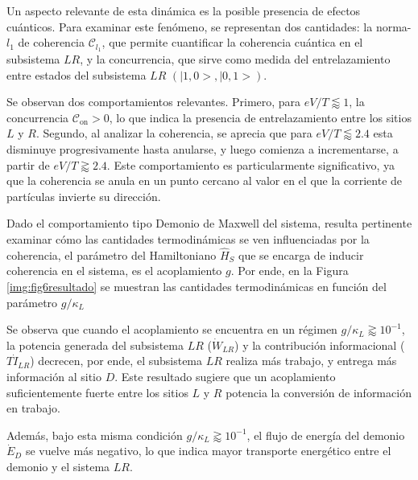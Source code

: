 Un aspecto relevante de esta dinámica es la posible presencia de efectos cuánticos. Para examinar este fenómeno, se representan dos cantidades: la norma-$l_{1}$ de coherencia \( \mathcal{C}_{l_{1}} \), que permite cuantificar la coherencia cuántica en el subsistema \( LR \), y la concurrencia, que sirve como medida del entrelazamiento entre estados del subsistema $LR$ $(|1,0>,|0,1>)$.


Se observan dos comportamientos relevantes. Primero, para \( eV/T \lessapprox 1 \), la concurrencia \( \mathcal{C}_{\text{on}} > 0 \), lo que indica la presencia de entrelazamiento entre los sitios \( L \) y \( R \). Segundo, al analizar la coherencia, se aprecia que para \( eV/T \lessapprox 2.4 \) esta disminuye progresivamente hasta anularse, y luego comienza a incrementarse, a partir de \( eV/T \gtrapprox 2.4 \). Este comportamiento es particularmente significativo, ya que la coherencia se anula en un punto cercano al valor en el que la corriente de partículas invierte su dirección. 

Dado el comportamiento tipo Demonio de Maxwell del sistema, resulta pertinente examinar cómo las cantidades termodinámicas se ven influenciadas por la coherencia, el parámetro del Hamiltoniano $\hat{H}_{S}$ que se encarga de inducir coherencia en el sistema, es el acoplamiento \( g \). Por ende, en la Figura \ref{img:fig6resultado} se muestran las cantidades termodinámicas en función del parámetro \( g/\kappa_{L} \) 


Se observa que cuando el acoplamiento se encuentra en un régimen \( g/\kappa_{L} \gtrapprox 10^{-1}\), la potencia generada del subsistema $LR$ ($\dot{W}_{LR}$) y la contribución informacional ($T\dot{I}_{LR}$) decrecen, por ende, el subsistema $LR$ realiza más trabajo, y entrega más información al sitio $D$. Este resultado sugiere que un acoplamiento suficientemente fuerte entre los sitios $L$ y $R$ potencia la conversión de información en trabajo. 

Además, bajo esta misma condición \( g/\kappa_{L} \gtrapprox 10^{-1} \), el flujo de energía del demonio \( \dot{E}_{D} \) se vuelve más negativo, lo que indica mayor transporte energético entre el demonio y el sistema $LR$.

